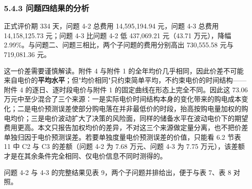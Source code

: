 \documentclass[12pt,a4paper]{ctexart}
\begin{document}
\subsubsection*{5.4.3 问题四结果的分析}

正式评价期 334 天，问题 4-2 总费用 14,595,194.94 元，问题 4-3 总费用 14,158,125.73 元；问题 4-3 比问题 4-2 低 437,069.21 元（43.71 万元），降幅 2.99\%。与问题二、问题三相比，两个子问题的费用分别高出 730,555.58 元与 719,081.36 元。

这一价差需要谨慎解读。附件 4 与附件 1 的全年均价几乎相同，因此价差不可能来自电价的\textbf{平均水平}；但"均价相同"只约束简单平均，不约束电价的时间结构——附件 4 的逐日、逐时段电价与附件 1 的固定曲线在形态上完全不同。因此这 73.06 万元中至少混合了三个来源：一是实际电价时间结构本身的变化带来的购电成本变化；二是电价预测误差使部分购电落在并非最低价的时段，抬高按购电量加权的购电均价；三是电价波动扩大了决策的风险面，同样的储备水平在波动电价下的期望费用更高。本文只报告加权均价的差异，不对这三个来源做定量分离，也不把价差单独归因于电价预测误差。若要单独度量电价预测误差的价值，只能看 6.2 节表 11 中 C2 与 C3 的差额（问题 4-2 为 7.68 万元、问题 4-3 为 7.75 万元），该差额才是在其余条件完全相同、仅电价信息不同时测得的。

问题 4-2 与 4-3 的完整结果见表 9，两个子问题并排给出，便于与表 7、表 8 对照。
\end{document}
